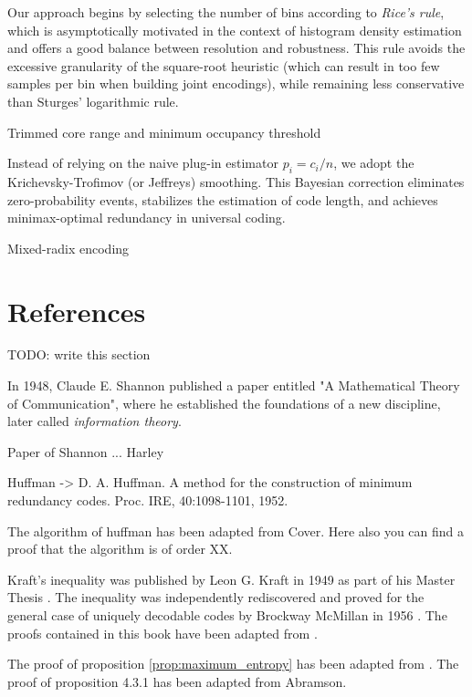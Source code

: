 {\color{red} Our approach begins by selecting the number of bins according to \emph{Rice's rule}, which is asymptotically motivated in the context of histogram density estimation and offers a good balance between resolution and robustness. This rule avoids the excessive granularity of the square-root heuristic (which can result in too few samples per bin when building joint encodings), while remaining less conservative than Sturges' logarithmic rule.}

{\color{red} Trimmed core range and minimum occupancy threshold}

{\color{red} Instead of relying on the naive plug-in estimator $p_i = c_i/n$, we adopt the Krichevsky-Trofimov (or Jeffreys) smoothing. This Bayesian correction eliminates zero-probability events, stabilizes the estimation of code length, and achieves minimax-optimal redundancy in universal coding.}

{\color{red} Mixed-radix encoding}

%
%

\section*{References}

{\color{red} TODO: write this section}

In 1948, Claude E. Shannon published a paper entitled "A Mathematical Theory of Communication", where he established the foundations of a new discipline, later called \emph{information theory}.

Paper of Shannon ... Harley

Huffman -> D. A. Huffman. A method for the construction of minimum redundancy codes. Proc. IRE, 40:1098-1101, 1952.

The algorithm of huffman has been adapted from Cover. Here also you can find a proof that the algorithm is of order XX. 

Kraft's inequality was published by Leon G. Kraft in 1949 as part of his Master Thesis \cite{kraft1949device}. The inequality was independently rediscovered and proved for the general case of uniquely decodable codes by Brockway McMillan in 1956 \cite{mcmillan1956two}. The proofs contained in this book have been adapted from \cite{cover2012elements}.


The proof of proposition \ref{prop:maximum_entropy} has been adapted from \cite{abramson1963information}.
The proof of proposition 4.3.1 has been adapted from Abramson.

